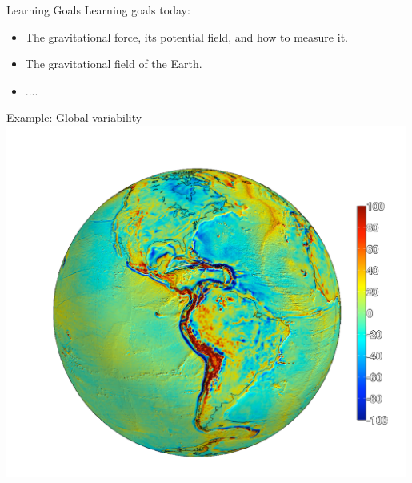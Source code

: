 \begin{frame}
  \begin{PointThree}{Learning Goals}
    \alert{Learning goals today:}
    \begin{itemize}
      \item The gravitational force, its potential field, and how to measure it.
      \item The gravitational field of the Earth.
      \item ....
    \end{itemize}
  \end{PointThree}
  \end{frame}

\begin{frame}
  \begin{PointSix}{Example: Global variability}
      \includegraphics[width=0.99\textwidth]{Figures/Gravity/Exported/Grace_JPLCaltect_FODT10_WithoutPeople.png}
  \end{PointSix}
\end{frame}

